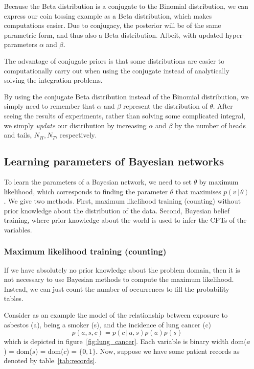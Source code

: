 \documentclass{article}
\newcommand{\giv}{\,|\,}
\begin{document}
\noindent Because the Beta distribution is a conjugate to the Binomial distribution, we can express our coin tossing example as a Beta distribution, which makes computations easier. Due to conjugacy, the posterior will be of the same parametric form, and thus also a Beta distribution. Albeit, with updated hyper-parameters $\alpha$ and $\beta$. 

The advantage of conjugate priors is that some distributions are easier to computationally carry out when using the conjugate instead of analytically solving the integration problems. 

By using the conjugate Beta distribution instead of the Binomial distribution, we simply need to remember that $\alpha$ and $\beta$ represent the distribution of $\theta$. After seeing the results of experiments, rather than solving some complicated integral, we simply \textit{update} our distribution by increasing $\alpha$ and $\beta$ by the number of heads and tails, $N_H, N_T$, respectively. 

\subsection{Learning parameters of Bayesian networks}

To learn the parameters of a Bayesian network, we need to set $\theta$ by maximum likelihood, which corresponds to finding the parameter $\theta$ that maximises $p(v \giv \theta)$. We give two methods. First, maximum likelihood training (counting) without prior knowledge about the distribution of the data. Second, Bayesian belief training, where prior knowledge about the world is used to infer the CPTs of the variables.  

\subsubsection{Maximum likelihood training (counting)}

If we have absolutely no prior knowledge about the problem domain, then it is not necessary to use Bayesian methods to compute the maximum likelihood. Instead, we can just count the number of occurrences to fill the probability tables. 

Consider as an example the model of the relationship between exposure to asbestos (a), being a smoker (s), and the incidence of lung cancer (c)
$$
    p(a, s, c) = p(c \giv a, s) p(a) p(s)
$$
\noindent which is depicted in figure~\ref{fig:lung_cancer}. Each variable is binary width dom($a$) = dom($s$) = dom($c$) = $\{0, 1\}$. Now, suppose we have some patient records as denoted by table~\ref{tab:records}. 
\end{document}

